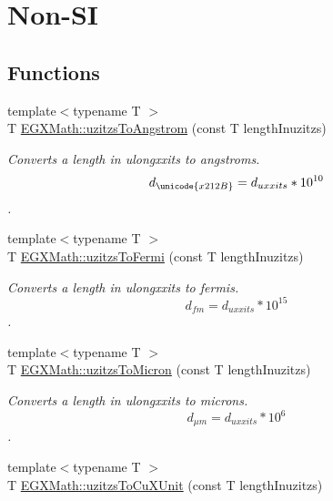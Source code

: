 \hypertarget{group___e_g_x_math-_conversions-_length_conversions-uzitzs-_non-_s_i}{}\section{Non-\/\+SI}
\label{group___e_g_x_math-_conversions-_length_conversions-uzitzs-_non-_s_i}
\subsection*{Functions}
\begin{DoxyCompactItemize}
\item 
{\footnotesize template$<$typename T $>$ }\\T \mbox{\hyperlink{group___e_g_x_math-_conversions-_length_conversions-uzitzs-_non-_s_i_gaaaecee65b1db5abcc71e18526e7073eb}{E\+G\+X\+Math\+::uzitzs\+To\+Angstrom}} (const T length\+Inuzitzs)
\begin{DoxyCompactList}\small\item\em Converts a length in ulongxxits to angstroms. \[ d_{\unicode{x212B}}=d_{uxxits} * 10^{10} \]. \end{DoxyCompactList}\item 
{\footnotesize template$<$typename T $>$ }\\T \mbox{\hyperlink{group___e_g_x_math-_conversions-_length_conversions-uzitzs-_non-_s_i_ga920cd8aae6bc9f70faa49a6a5c988040}{E\+G\+X\+Math\+::uzitzs\+To\+Fermi}} (const T length\+Inuzitzs)
\begin{DoxyCompactList}\small\item\em Converts a length in ulongxxits to fermis. \[ d_{fm}=d_{uxxits} * 10^{15} \]. \end{DoxyCompactList}\item 
{\footnotesize template$<$typename T $>$ }\\T \mbox{\hyperlink{group___e_g_x_math-_conversions-_length_conversions-uzitzs-_non-_s_i_ga695a8fd8870537930d6378e99ad2aa9f}{E\+G\+X\+Math\+::uzitzs\+To\+Micron}} (const T length\+Inuzitzs)
\begin{DoxyCompactList}\small\item\em Converts a length in ulongxxits to microns. \[ d_{\mu m}=d_{uxxits} * 10^{6} \]. \end{DoxyCompactList}\item 
{\footnotesize template$<$typename T $>$ }\\T \mbox{\hyperlink{group___e_g_x_math-_conversions-_length_conversions-uzitzs-_non-_s_i_gab25470e41b88c41d4bf32622baa6c472}{E\+G\+X\+Math\+::uzitzs\+To\+Cu\+X\+Unit}} (const T length\+Inuzitzs)

\end{DoxyCompactItemize}
